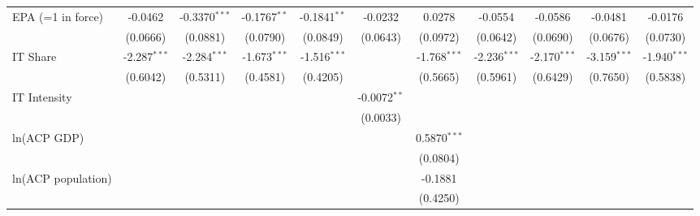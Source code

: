 \begin{tabular}{lcccccccccc}
   EPA (=1 in force)                                  & -0.0462        & -0.3370$^{***}$ & -0.1767$^{**}$ & -0.1841$^{**}$  & -0.0232        & 0.0278         & -0.0554          & -0.0586        & -0.0481             & -0.0176\\   
                                                      & (0.0666)       & (0.0881)        & (0.0790)       & (0.0849)        & (0.0643)       & (0.0972)       & (0.0642)         & (0.0690)       & (0.0676)            & (0.0730)\\   
   IT Share                                           & -2.287$^{***}$ & -2.284$^{***}$  & -1.673$^{***}$ & -1.516$^{***}$  &                & -1.768$^{***}$ & -2.236$^{***}$   & -2.170$^{***}$ & -3.159$^{***}$      & -1.940$^{***}$\\   
                                                      & (0.6042)       & (0.5311)        & (0.4581)       & (0.4205)        &                & (0.5665)       & (0.5961)         & (0.6429)       & (0.7650)            & (0.5838)\\   
   IT Intensity                                       &                &                 &                &                 & -0.0072$^{**}$ &                &                  &                &                     &   \\   
                                                      &                &                 &                &                 & (0.0033)       &                &                  &                &                     &   \\   
   ln(ACP GDP)                                        &                &                 &                &                 &                & 0.5870$^{***}$ &                  &                &                     &   \\   
                                                      &                &                 &                &                 &                & (0.0804)       &                  &                &                     &   \\   
   ln(ACP population)                                 &                &                 &                &                 &                & -0.1881        &                  &                &                     &   \\   
                                                      &                &                 &                &                 &                & (0.4250)       &                  &                &                     &   \\   

\end{tabular}
